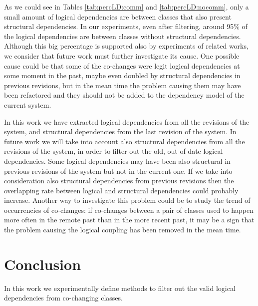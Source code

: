 \documentclass[a4paper,twoside]{article}
\begin{document}
As we could see in Tables \ref{tab:percLD:comm} and \ref{tab:percLD:nocomm}, only a small amount of logical dependencies are between classes that also present structural dependencies.  In our experiments, even after filtering, around 95\% of the logical dependencies are between classes without structural dependencies. Although this big percentage is supported also by experiments of related works, we consider that future work must further investigate its cause. One possible cause could be that some of the co-changes were legit logical dependencies at some moment in the past, maybe even doubled by structural dependencies in previous revisions, but in the mean time the problem causing them may have been refactored and they should not be added to the dependency model of the current system.  

In this work we have extracted logical dependencies from all the revisions of the system, and structural dependencies from the last revision of the system. In future work we will take into account also structural dependencies from all the revisions of the system, in order to filter out the old, out-of-date logical dependencies.  Some logical dependencies may have been also structural in previous revisions of the system but not in the current one. If we take into consideration also structural dependencies from previous revisions then the overlapping rate between logical and structural dependencies could probably increase. Another way to investigate this problem could be to study the trend of occurrencies of co-changes: if co-changes between a pair of classes used to happen more often in the remote past than in the more recent past, it may be a sign that the problem causing the logical coupling has been removed in the mean time. 


   


\section{Conclusion}
\label{sec:Conclusion}
   
In this work we experimentally define methods to filter out the valid logical dependencies from co-changing classes. 

\end{document}
